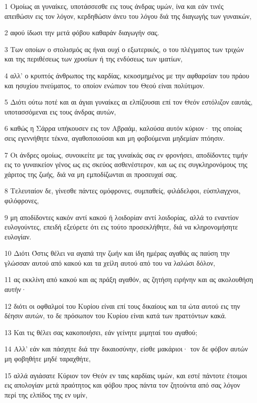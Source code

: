 \par 1 Ομοίως αι γυναίκες, υποτάσσεσθε εις τους άνδρας υμών, ίνα και εάν τινές απειθώσιν εις τον λόγον, κερδηθώσιν άνευ του λόγου διά της διαγωγής των γυναικών,
\par 2 αφού ίδωσι την μετά φόβου καθαράν διαγωγήν σας.
\par 3 Των οποίων ο στολισμός ας ήναι ουχί ο εξωτερικός, ο του πλέγματος των τριχών και της περιθέσεως των χρυσίων ή της ενδύσεως των ιματίων,
\par 4 αλλ' ο κρυπτός άνθρωπος της καρδίας, κεκοσμημένος με την αφθαρσίαν του πράου και ησυχίου πνεύματος, το οποίον ενώπιον του Θεού είναι πολύτιμον.
\par 5 Διότι ούτω ποτέ και αι άγιαι γυναίκες αι ελπίζουσαι επί τον Θεόν εστόλιζον εαυτάς, υποτασσόμεναι εις τους άνδρας αυτών,
\par 6 καθώς η Σάρρα υπήκουσεν εις τον Αβραάμ, καλούσα αυτόν κύριον· της οποίας σεις εγεννήθητε τέκνα, αγαθοποιούσαι και μη φοβούμεναι μηδεμίαν πτόησιν.
\par 7 Οι άνδρες ομοίως, συνοικείτε με τας γυναίκάς σας εν φρονήσει, αποδίδοντες τιμήν εις το γυναικείον γένος ως εις σκεύος ασθενέστερον, και ως εις συγκληρονόμους της χάριτος της ζωής, διά να μη εμποδίζωνται αι προσευχαί σας.
\par 8 Τελευταίον δε, γίνεσθε πάντες ομόφρονες, συμπαθείς, φιλάδελφοι, εύσπλαγχνοι, φιλόφρονες,
\par 9 μη αποδίδοντες κακόν αντί κακού ή λοιδορίαν αντί λοιδορίας, αλλά το εναντίον ευλογούντες, επειδή εξεύρετε ότι εις τούτο προσεκλήθητε, διά να κληρονομήσητε ευλογίαν.
\par 10 Διότι Όστις θέλει να αγαπά την ζωήν και ίδη ημέρας αγαθάς ας παύση την γλώσσαν αυτού από κακού και τα χείλη αυτού από του να λαλώσι δόλον,
\par 11 ας εκκλίνη από κακού και ας πράξη αγαθόν, ας ζητήση ειρήνην και ας ακολουθήση αυτήν·
\par 12 διότι οι οφθαλμοί του Κυρίου είναι επί τους δικαίους και τα ώτα αυτού εις την δέησιν αυτών, το δε πρόσωπον του Κυρίου είναι κατά των πραττόντων κακά.
\par 13 Και τις θέλει σας κακοποιήσει, εάν γείνητε μιμηταί του αγαθού;
\par 14 Αλλ' εάν και πάσχητε διά την δικαιοσύνην, είσθε μακάριοι· τον δε φόβον αυτών μη φοβηθήτε μηδέ ταραχθήτε,
\par 15 αλλά αγιάσατε Κύριον τον Θεόν εν ταις καρδίαις υμών, και εστέ πάντοτε έτοιμοι εις απολογίαν μετά πραότητος και φόβου προς πάντα τον ζητούντα από σας λόγον περί της ελπίδος της εν υμίν,
